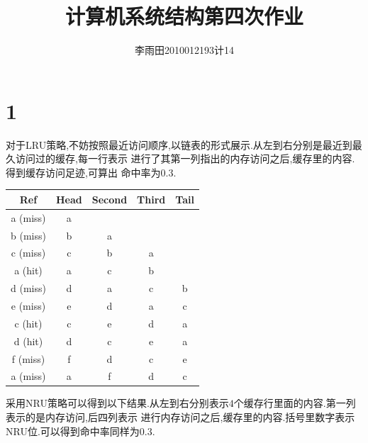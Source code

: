 \documentclass[adobefonts, nocap]{ctexart}
\begin{document}
  \title{计算机系统结构第四次作业}
  \author{李雨田\hspace{1em}2010012193\hspace{1em}计14}
  \maketitle
  \section*{1}
    对于LRU策略,不妨按照最近访问顺序,以链表的形式展示.从左到右分别是最近到最久访问过的缓存,每一行表示
    进行了其第一列指出的内存访问之后,缓存里的内容.得到缓存访问足迹,可算出
    命中率为$0.3$.

    \begin{center}
      \begin{tabular}{c||c|c|c|c}
        Ref & Head & Second & Third & Tail \\ \hline
        a (miss) & a & ~ & ~ & ~ \\
        b (miss) & b & a & ~ & ~ \\
        c (miss) & c & b & a & ~ \\
        a (hit) & a & c & b & ~ \\
        d (miss) & d & a & c & b \\
        e (miss) & e & d & a & c \\
        c (hit) & c & e & d & a \\
        d (hit) & d & c & e & a \\
        f (miss) & f & d & c & e \\
        a (miss) & a & f & d & c \\
      \end{tabular}
    \end{center}

    采用NRU策略可以得到以下结果.从左到右分别表示$4$个缓存行里面的内容.第一列表示的是内存访问,后四列表示
    进行内存访问之后,缓存里的内容.括号里数字表示NRU位.可以得到命中率同样为$0.3$.
\end{document}
